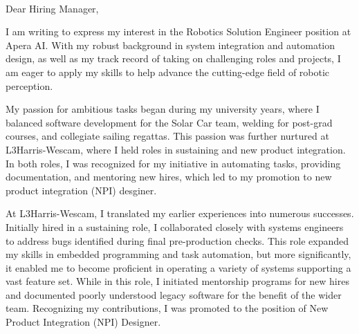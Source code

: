 \documentclass[a4paper,ragged2e,withhyper]{altacv}
\begin{document}
\graphicspath{
    {emoticons/interests}
}

\DeclareRobustCommand{\addEmoticon}[1]{%
  \begingroup\normalfont
  \texttt{[image: \#1]}%
  \endgroup
}

\\
  \medskip


\begin{fullwidth}
\makecvheader


\noindent
Dear Hiring Manager,

\vspace{0.5cm}

\noindent
I am writing to express my interest in the Robotics Solution Engineer position at Apera AI. With my robust background in system integration and automation design, as well as my track record of taking on challenging roles and projects, I am eager to apply my skills to help advance the cutting-edge field of robotic perception.

\vspace{0.5cm}

\noindent

My passion for ambitious tasks began during my university years, where I balanced software development for the Solar Car team, welding for post-grad courses, and collegiate sailing regattas. This passion was further nurtured at L3Harris-Wescam, where I held roles in sustaining and new product integration. In both roles, I was recognized for my initiative in automating tasks, providing documentation, and mentoring new hires, which led to my promotion to new product integration (NPI) desginer.

\noindent

\vspace{0.5cm}

At L3Harris-Wescam, I translated my earlier experiences into numerous successes. Initially hired in a sustaining role, I collaborated closely with systems engineers to address bugs identified during final pre-production checks. This role expanded my skills in embedded programming and task automation, but more significantly, it enabled me to become proficient in operating a variety of systems supporting a vast feature set. While in this role, I initiated mentorship programs for new hires and documented poorly understood legacy software for the benefit of the wider team. Recognizing my contributions, I was promoted to the position of New Product Integration (NPI) Designer.


\end{fullwidth}
\end{document}
